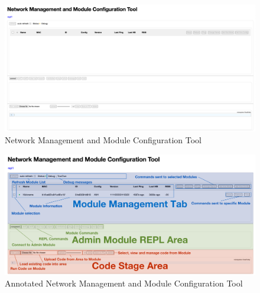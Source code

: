 \begin{figure}[H]
    \centering
    \includegraphics[width=\linewidth]{overleaf/images/nmmct_cropped.png}
    \vspace{.5\ftspace}
    \caption{Network Management and Module Configuration Tool}
    \label{fig:nmmct_raw_met}
\end{figure}
\begin{figure}[H]
    \centering
    \includegraphics[width=\linewidth]{overleaf/images/nmmct_ac.png}
    \vspace{\ftspace}
    \caption{Annotated Network Management and Module Configuration Tool}
    \label{fig:nmmct}
\end{figure}

